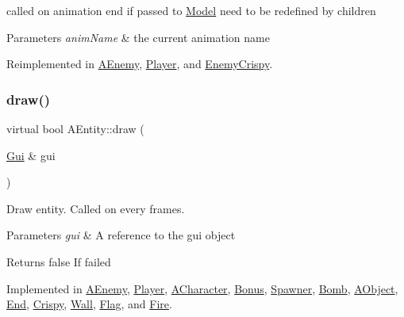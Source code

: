 called on animation end if passed to \hyperlink{class_model}{Model} need to be redefined by children 


\begin{DoxyParams}{Parameters}
{\em anim\+Name} & the current animation name \\
\hline
\end{DoxyParams}


Reimplemented in \hyperlink{class_a_enemy_ac946b6cd7d96f99365301450566d3baf}{A\+Enemy}, \hyperlink{class_player_a26c511cf5a62d7de26347cdc15df609b}{Player}, and \hyperlink{class_enemy_crispy_a32d938b70f4b0f2bd2e1df606c812d13}{Enemy\+Crispy}.

\mbox{\label{class_a_entity_ad9404a7cae108eb81d881d256cacdc12}} 
\subsubsection{\texorpdfstring{draw()}{draw()}}
{\footnotesize\ttfamily virtual bool A\+Entity\+::draw (\begin{DoxyParamCaption}\item[{\hyperlink{class_gui}{Gui} \&}]{gui }\end{DoxyParamCaption})\hspace{0.3cm}{\ttfamily [pure virtual]}}



Draw entity. Called on every frames. 


\begin{DoxyParams}{Parameters}
{\em gui} & A reference to the gui object \\
\hline
\end{DoxyParams}
\begin{DoxyReturn}{Returns}
false If failed 
\end{DoxyReturn}


Implemented in \hyperlink{class_a_enemy_a527fc4b7bb46c04c486fd025a01e16a9}{A\+Enemy}, \hyperlink{class_player_a1194c157df144e864d0328d267dfa75c}{Player}, \hyperlink{class_a_character_af223d3c9dbd3143daf62e9834bd30e3d}{A\+Character}, \hyperlink{class_bonus_acdb40deca7be37984084fb3d4fef85ed}{Bonus}, \hyperlink{class_spawner_a1532fd875b6a3aacb617b1111b818f01}{Spawner}, \hyperlink{class_bomb_ae0ea4aa0ce14d353ad63c31cccc2a69d}{Bomb}, \hyperlink{class_a_object_a5e454e13e04ee937c20a465244cf748a}{A\+Object}, \hyperlink{class_end_aad5c7ef71927eddfd634e0a0879cb99a}{End}, \hyperlink{class_crispy_a266bebd70e55a7d08ba1688af0f4adf0}{Crispy}, \hyperlink{class_wall_ab3ea42b91f7830d22782901d61be505f}{Wall}, \hyperlink{class_flag_ae24cc9c0e3cc3378e12af9f40c0ee93d}{Flag}, and \hyperlink{class_fire_a622efdbee6254c463250b6d9033428eb}{Fire}.

